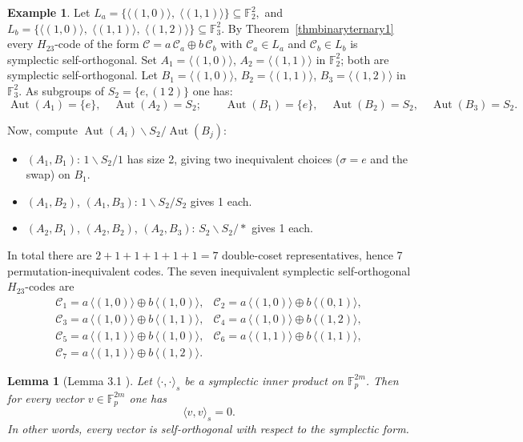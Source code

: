 \documentclass[11pt,a4paper]{article}
\newtheorem{lemma}[theorem]{Lemma}
\theoremstyle{definition}
\newtheorem{example}[theorem]{Example}
\numberwithin{equation}{section}
\newcommand{\F}{\mathbb{F}}
\def\C{{\mathcal{C}}}
\begin{document}
\begin{example}
	
Let $
L_a=\{\langle(1,0)\rangle,\;\langle(1,1)\rangle\}\subseteq\F_2^2,$ and $L_b=\{\langle(1,0)\rangle,\;\langle(1,1)\rangle,\;\langle(1,2)\rangle\}\subseteq\F_3^2.$
By Theorem~\ref{thmbinaryternary1} every \(H_{23}\)-code of the form \(\C=a\,\C_a\oplus b\,\C_b\) with \(\C_a\in L_a\) and \(\C_b\in L_b\) is symplectic self-orthogonal. Set \(A_1=\langle(1,0)\rangle\), \(A_2=\langle(1,1)\rangle\) in \(\F_2^2\); both are symplectic self-orthogonal.  Let \(B_1=\langle(1,0)\rangle\), \(B_2=\langle(1,1)\rangle\), \(B_3=\langle(1,2)\rangle\) in \(\F_3^2\). As subgroups of \(S_2=\{e,(1\ 2)\}\) one has:
\[
\operatorname{Aut}(A_1)=\{e\},\quad \operatorname{Aut}(A_2)=S_2;
\qquad
\operatorname{Aut}(B_1)=\{e\},\quad \operatorname{Aut}(B_2)=S_2,\quad \operatorname{Aut}(B_3)=S_2.
\]


Now, compute \(\operatorname{Aut}(A_i)\backslash S_2/\operatorname{Aut}(B_j)\):
\begin{itemize}
  \item \((A_1,B_1)\): \(1\backslash S_2/1\) has size 2, giving two inequivalent choices (\(\sigma=e\) and the swap) on \(B_1\).
  \item \((A_1,B_2)\), \((A_1,B_3)\): \(1\backslash S_2/S_2\) gives 1 each.
  \item \((A_2,B_1)\), \((A_2,B_2)\), \((A_2,B_3)\): \(S_2\backslash S_2/*\) gives 1 each.
\end{itemize}
In total there are \(2+1+1+1+1+1=7\) double-coset representatives, hence 7 permutation-inequivalent codes.
The seven inequivalent symplectic self-orthogonal \(H_{23}\)-codes are
\[
\begin{array}{ll}
\C_1 = a\,\langle(1,0)\rangle \oplus b\,\langle(1,0)\rangle, &
\C_2 = a\,\langle(1,0)\rangle \oplus b\,\langle(0,1)\rangle,\\
\C_3 = a\,\langle(1,0)\rangle \oplus b\,\langle(1,1)\rangle, &
\C_4 = a\,\langle(1,0)\rangle \oplus b\,\langle(1,2)\rangle,\\
\C_5 = a\,\langle(1,1)\rangle \oplus b\,\langle(1,0)\rangle, &
\C_6 = a\,\langle(1,1)\rangle \oplus b\,\langle(1,1)\rangle,\\
\C_7 = a\,\langle(1,1)\rangle \oplus b\,\langle(1,2)\rangle. &
\end{array}
\]


\end{example}
\begin{lemma}[Lemma 3.1 \cite{}]
Let \(\langle\cdot,\cdot\rangle_s\) be a symplectic inner product on \(\mathbb{F}_p^{2m}\). Then for every vector \(v\in\mathbb{F}_p^{2m}\) one has
\[
\langle v,v\rangle_s=0.
\]
In other words, every vector is self-orthogonal with respect to the symplectic form.
\end{lemma}
\end{document}
